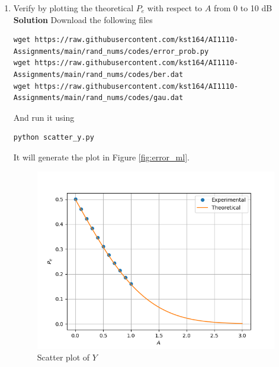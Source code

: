 \documentclass[journal, 12pt, twocolumn]{IEEEtran}
\begin{document}
\begin{enumerate}[label=\arabic{section}.\arabic*]
    \item
        Verify by plotting the theoretical $P_e$ with respect to $A$ from 0 to 10 dB
        \\
        \textbf{Solution} Download the following files
        \begin{lstlisting}
wget https://raw.githubusercontent.com/kst164/AI1110-Assignments/main/rand_nums/codes/error_prob.py
wget https://raw.githubusercontent.com/kst164/AI1110-Assignments/main/rand_nums/codes/ber.dat
wget https://raw.githubusercontent.com/kst164/AI1110-Assignments/main/rand_nums/codes/gau.dat
        \end{lstlisting}
        And run it using
        \begin{lstlisting}
python scatter_y.py
        \end{lstlisting}
        It will generate the plot in Figure \eqref{fig:error_ml}.
        \begin{figure}[!ht]
            \includegraphics[width=\columnwidth]{figs/error_ml.png}
            \caption{Scatter plot of $Y$}
            \label{fig:error_ml}
        \end{figure}


\end{enumerate}
\end{document}
